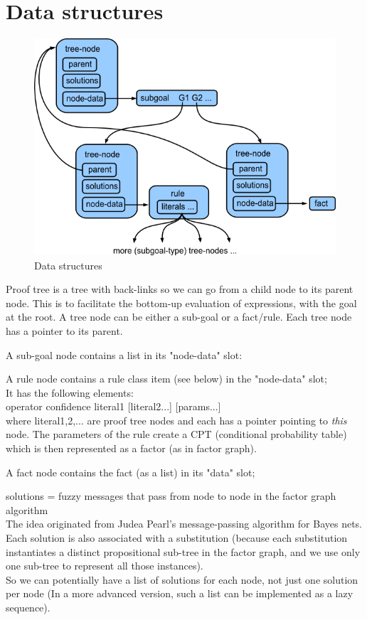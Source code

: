 \section{Data structures}

\begin{figure}[h]
\centering
\includegraphics{Lisp-data-structures.png}
\caption{Data structures}
\end{figure}

Proof tree is a tree with back-links so we can go from a child node to its parent node.
This is to facilitate the bottom-up evaluation of expressions, with the goal at the root.
A tree node can be either a sub-goal or a fact/rule.
Each tree node has a pointer to its parent.

A sub-goal node contains a list in its "node-data" slot:\\
\tab {}

A rule node contains a rule class item (see below) in the "node-data" slot; \\
It has the following elements: \\
\tab operator confidence literal1 [literal2...] [params...]\\
where literal1,2,... are proof tree nodes and each has a pointer pointing to \textit{this} node.
The parameters of the rule create a CPT (conditional probability table) which is then
represented as a factor (as in factor graph).

A fact node contains the fact (as a list) in its "data" slot;

solutions = fuzzy messages that pass from node to node in the factor graph algorithm\\
The idea originated from Judea Pearl's message-passing algorithm for Bayes nets.
Each solution is also associated with a substitution (because each substitution instantiates
a distinct propositional sub-tree in the factor graph, and we use only one sub-tree to
represent all those instances).\\
So we can potentially have a list of solutions for each node, not just one solution per node
(In a more advanced version, such a list can be implemented as a lazy sequence).

